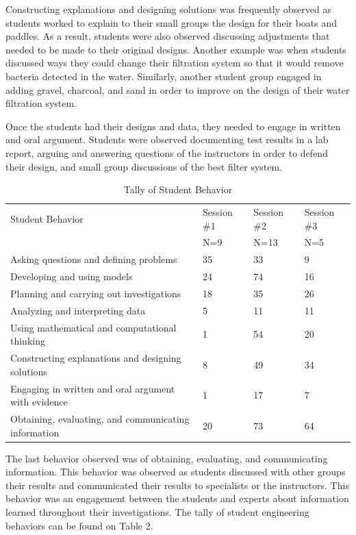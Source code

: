 \documentclass[11.5pt]{sig-alternate} %
\begin{document}
\begin{large}
Constructing explanations and designing solutions was frequently observed as students worked to explain to their small groups the design for their boats and paddles. As a result, students were also observed discussing adjustments that needed to be made to their original designs. Another example was when students discussed ways they could change their filtration system so that it would remove bacteria detected in the water. Similarly, another student group engaged in adding gravel, charcoal, and sand in order to improve on the design of their water filtration system.

Once the students had their designs and data, they needed to engage in written and oral argument. Students were observed documenting test results in a lab report, arguing and answering questions of the instructors in order to defend their design, and small group discussions of the best filter system.

\begin{table}[t]
\caption{Tally of Student Behavior}
\begin{tabular}{p{3in}p{2in}p{2in}p{2in}}
Student Behavior & Session \#1 & Session \#2 & Session \#3 \\
 & N=9 & N=13 & N=5 \\ \hline
Asking questions and defining problems & 35 & 33 & 9 \\
Developing and using models & 24 & 74 & 16 \\
Planning and carrying out investigations & 18 & 35 & 26 \\
Analyzing and interpreting data & 5 & 11 & 11 \\
Using mathematical and computational thinking & 1 & 54 & 20 \\
Constructing explanations and designing solutions & 8 & 49 & 34 \\
Engaging in written and oral argument with evidence & 1 & 17 & 7 \\
Obtaining, evaluating, and communicating information & 20 & 73 & 64 \\
\end{tabular}
\end{table}

The last behavior observed was of obtaining, evaluating, and communicating information. This behavior was observed as students discussed with other groups their results and communicated their results to specialists or the instructors. This behavior was an engagement between the students and experts about information learned throughout their investigations. The tally of student engineering behaviors can be found on Table 2.


\end{large}
\end{document}
